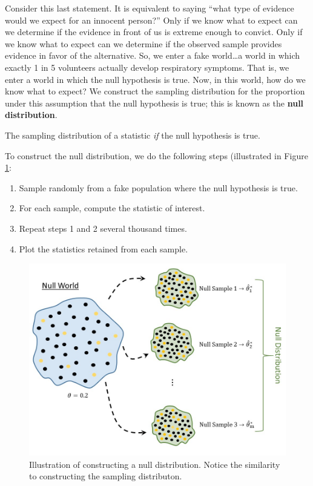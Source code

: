 \documentclass[]{book}
\providecommand{\tightlist}{%
  \setlength{\itemsep}{0pt}\setlength{\parskip}{0pt}}
\theoremstyle{definition}
\theoremstyle{definition}
\theoremstyle{remark}
\let\BeginKnitrBlock\begin \let\EndKnitrBlock\end
\begin{document}
Consider this last statement. It is equivalent to saying ``what type of
evidence would we expect for an innocent person?'' Only if we know what
to expect can we determine if the evidence in front of us is extreme
enough to convict. Only if we know what to expect can we determine if
the observed sample provides evidence in favor of the alternative. So,
we enter a fake world\ldots{}a world in which exactly 1 in 5 volunteers
actually develop respiratory symptoms. That is, we enter a world in
which the null hypothesis is true. Now, in this world, how do we know
what to expect? We construct the sampling distribution for the
proportion under this assumption that the null hypothesis is true; this
is known as the \textbf{null distribution}.

\BeginKnitrBlock{definition}[Null Distribution]
\protect\hypertarget{def:defn-null-distribution}{}{\label{def:defn-null-distribution}
{} }The sampling distribution of a
statistic \emph{if} the null hypothesis is true.
\EndKnitrBlock{definition}

To construct the null distribution, we do the following steps
(illustrated in Figure \ref{fig:nulldistns-null-distribution}:

\begin{enumerate}
\def\labelenumi{\arabic{enumi}.}
\tightlist
\item
  Sample randomly from a fake population where the null hypothesis is
  true.
\item
  For each sample, compute the statistic of interest.
\item
  Repeat steps 1 and 2 several thousand times.
\item
  Plot the statistics retained from each sample.
\end{enumerate}

\begin{figure}

{\centering \includegraphics[width=0.8\linewidth]{./images/NullDistns-Null-Distribution} 

}

\caption{Illustration of constructing a null distribution.  Notice the similarity to constructing the sampling distributon.}\label{fig:nulldistns-null-distribution}
\end{figure}
\end{document}
